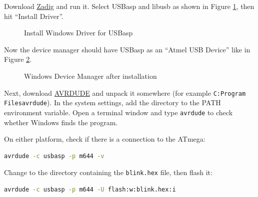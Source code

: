 \documentclass{article}
\newcommand{\file}[1]{\texttt{#1}}
\begin{document}
Download \href{https://zadig.akeo.ie/}{Zadig} and run it. Select USBasp and libusb as shown in Figure \ref{fig:driverUSBasp}, then hit ``Install Driver''. 
\begin{figure}[htb]
\centering
{}
\caption{Install Windows Driver for USBasp}
\label{fig:driverUSBasp}
\end{figure}

Now the device manager should have USBasp as an ``Atmel USB Device'' like in Figure \ref{fig:deviceManagerAfter}. 
\begin{figure}[htb]
\centering
{}
\caption{Windows Device Manager after installation}
\label{fig:deviceManagerAfter}
\end{figure}

Next, download \href{https://github.com/avrdudes/avrdude/releases}{AVRDUDE} and unpack it somewhere (for example \file{C:Program Files\symbol{`\\}avrdude}). In the system settings, add the directory to the PATH environment variable. Open a terminal window and type \lstinline[language=bash]{avrdude} to check whether Windows finds the program. 

On either platform, check if there is a connection to the ATmega:
\begin{lstlisting}[language=bash]
avrdude -c usbasp -p m644 -v
\end{lstlisting}

Change to the directory containing the \file{blink.hex} file, then flash it:
\begin{lstlisting}[language=bash]
avrdude -c usbasp -p m644 -U flash:w:blink.hex:i
\end{lstlisting}
\end{document}
